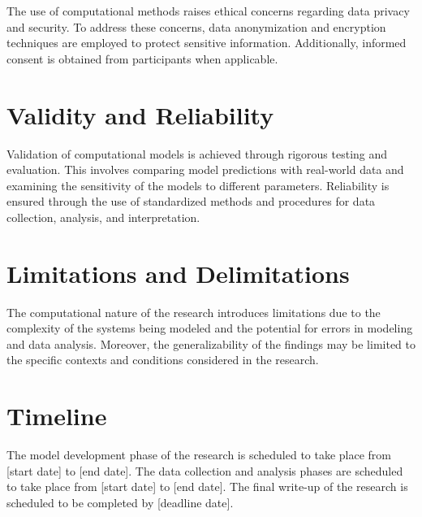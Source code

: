 The use of computational methods raises ethical concerns regarding data privacy and security. To address these concerns, data anonymization and encryption techniques are employed to protect sensitive information. Additionally, informed consent is obtained from participants when applicable.

\section{Validity and Reliability}

Validation of computational models is achieved through rigorous testing and evaluation. This involves comparing model predictions with real-world data and examining the sensitivity of the models to different parameters. Reliability is ensured through the use of standardized methods and procedures for data collection, analysis, and interpretation.

\section{Limitations and Delimitations}

The computational nature of the research introduces limitations due to the complexity of the systems being modeled and the potential for errors in modeling and data analysis. Moreover, the generalizability of the findings may be limited to the specific contexts and conditions considered in the research.

\section{Timeline}

The model development phase of the research is scheduled to take place from [start date] to [end date]. The data collection and analysis phases are scheduled to take place from [start date] to [end date]. The final write-up of the research is scheduled to be completed by [deadline date].